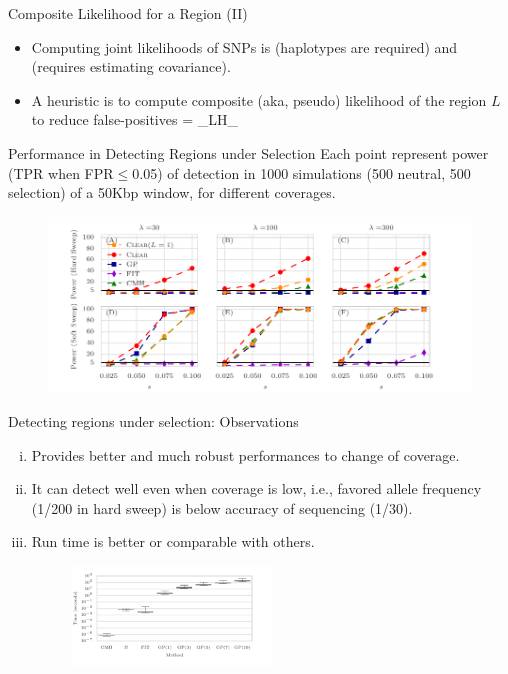 \documentclass[t]{beamer} %
\begin{document}
\begin{frame}{Composite Likelihood for a Region (II)}
	\begin{itemize}
		\item Computing joint likelihoods of SNPs is  
		(haplotypes are 
		required) and  (requires estimating covariance).
		\pause
		\item A heuristic is to compute composite (aka, pseudo) likelihood of  
		the 
		region $L$ to reduce false-positives
		\beqq
		\Hc = \sum_{\ell \in L}H_\ell
		\eeqq
	\end{itemize}
\end{frame}


\begin{frame}{ Performance in Detecting Regions under Selection}
Each point represent power  (TPR when FPR$\le$0.05) of detection in 1000 
simulations (500 neutral, 500 selection) of a 50Kbp window, for different 
coverages.
		\begin{figure}
			\includegraphics[trim={.05in .0in 0.0in 
				0in},clip,width=\textwidth]{../figures/power.pdf}
		\end{figure}
\end{frame}

\begin{frame}{ Detecting regions under selection: Observations}
\begin{enumerate}[(i)]
	\item Provides better and much robust performances to change of coverage.
	\pause
	\item It can detect well even when coverage is low, i.e., favored allele 
	frequency (1/200 in hard 
	sweep) is below accuracy of sequencing (1/30).
	\pause
	\item Run time is better or comparable with others.
	\begin{figure}
		\includegraphics[trim={.0in .0in 0.0in 
			0in},clip,width=0.5\textwidth]{../figures/runTime.pdf}
	\end{figure}
\end{enumerate}
\end{frame}
\end{document}
